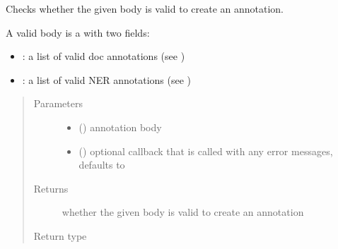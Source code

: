 \documentclass[letterpaper,10pt,english]{sphinxmanual}
\begin{document}
\begin{fulllineitems}
\label{\detokenize{autoapi/pine/client/models/index:pine.client.models.is_valid_annotation}}
Checks whether the given body is valid to create an annotation.

A valid body is a  with two fields:
\begin{itemize}
\item {} 
: a list of valid doc annotations (see {\hyperref[\detokenize{autoapi/pine/client/models/index:pine.client.models.is_valid_doc_annotation}]{}})

\item {} 
: a list of valid NER annotations (see {\hyperref[\detokenize{autoapi/pine/client/models/index:pine.client.models.is_valid_ner_annotation}]{}})

\end{itemize}
\begin{quote}\begin{description}
\item[{Parameters}] \leavevmode\begin{itemize}
\item {} 
 () \textendash{} annotation body

\item {} 
 (\sphinxstyleliteralemphasis{\sphinxupquote{, }}) \textendash{} optional callback that is called with any error messages, defaults to 

\end{itemize}

\item[{Returns}] \leavevmode
whether the given body is valid to create an annotation

\item[{Return type}] \leavevmode
{}

\end{description}\end{quote}

\end{fulllineitems}
\end{document}
